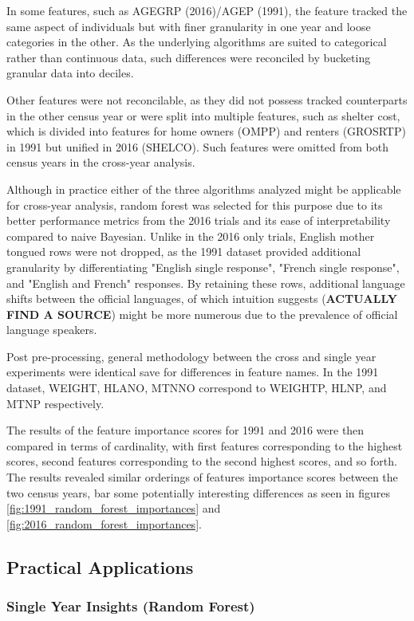 \documentclass[10pt, conference, compsocconf]{IEEEtran}
\begin{document}
In some features, such as AGEGRP (2016)/AGEP (1991), the feature tracked the same aspect of individuals but with finer granularity in one year and loose categories in the other.  As the underlying algorithms are suited to categorical rather than continuous data, such differences were reconciled by bucketing granular data into deciles.

Other features were not reconcilable, as they did not possess tracked counterparts in the other census year or were split into multiple features, such as shelter cost, which is divided into features for home owners (OMPP) and renters (GROSRTP) in 1991 but unified in 2016 (SHELCO).  Such features were omitted from both census years in the cross-year analysis.

Although in practice either of the three algorithms analyzed might be applicable for cross-year analysis, random forest was selected for this purpose due to its better performance metrics from the 2016 trials and its ease of interpretability compared to naive Bayesian.  Unlike in the 2016 only trials, English mother tongued rows were not dropped, as the 1991 dataset provided additional granularity by differentiating "English single response", "French single response", and "English and French" responses.  By retaining these rows, additional language shifts between the official languages, of which intuition suggests (\textbf{ACTUALLY FIND A SOURCE}) might be more numerous due to the prevalence of official language speakers.

Post pre-processing, general methodology between the cross and single year experiments were identical save for differences in feature names.  In the 1991 dataset, WEIGHT, HLANO, MTNNO correspond to WEIGHTP, HLNP, and MTNP respectively.

The results of the feature importance scores for 1991 and 2016 were then compared in terms of cardinality, with first features corresponding to the highest scores, second features corresponding to the second highest scores, and so forth.  The results revealed similar orderings of features importance scores between the two census years, bar some potentially interesting differences as seen in figures \ref{fig:1991_random_forest_importances} and \ref{fig:2016_random_forest_importances}.

\subsection{Practical Applications}

\subsubsection{Single Year Insights (Random Forest)}
\end{document}

